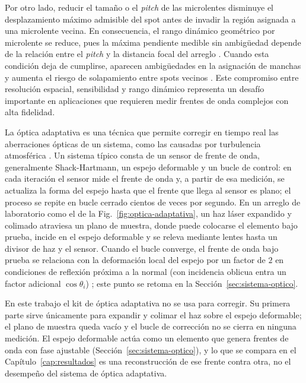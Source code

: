 \documentclass[letterpaper,12pt,oneside]{book}
\makeatletter
\renewcommand\section{\@startsection{section}{1}{\z@}{-3.5ex \@plus -1ex \@minus -.2ex}{2.3ex \@plus.2ex}{\normalfont\Large\bfseries\raggedright}}
\makeatother
\begin{document}
Por otro lado, reducir el tamaño o el \textit{pitch} de las microlentes disminuye el
desplazamiento máximo admisible del spot antes de invadir la región asignada a una
microlente vecina. En consecuencia, el rango dinámico geométrico por microlente se reduce,
pues la máxima pendiente medible sin ambigüedad depende de la relación entre el
\textit{pitch} y la distancia focal del arreglo \cite{AkondiDubra,FuerstDivergent}. Cuando
esta condición deja de cumplirse, aparecen ambigüedades en la asignación de manchas y
aumenta el riesgo de solapamiento entre spots vecinos \cite{GuoScanning,AkondiDubra}. Este
compromiso entre resolución espacial, sensibilidad y rango dinámico representa un desafío
importante en aplicaciones que requieren medir frentes de onda complejos con alta
fidelidad.

\section{Óptica adaptativa} \label{ch:optica-adaptativa}

La óptica adaptativa es una técnica que permite corregir en tiempo real las aberraciones
ópticas de un sistema, como las causadas por turbulencia atmosférica \cite{TysonAO}. Un
sistema típico consta de un sensor de frente de onda, generalmente Shack-Hartmann, un
espejo deformable y un bucle de control: en cada iteración el sensor mide el frente de
onda y, a partir de esa medición, se actualiza la forma del espejo hasta que el frente que
llega al sensor es plano; el proceso se repite en bucle cerrado cientos de veces por
segundo. En un arreglo de laboratorio como el de la Fig.~\ref{fig:optica-adaptativa}, un
haz láser expandido y colimado atraviesa un plano de muestra, donde puede colocarse el
elemento bajo prueba, incide en el espejo deformable y se releva mediante lentes hasta un
divisor de haz y el sensor. Cuando el bucle converge, el frente de onda bajo prueba se
relaciona con la deformación local del espejo por un factor de $2$ en condiciones de
reflexión próxima a la normal (con incidencia oblicua entra un factor adicional
$\cos\theta_i$) \cite[p.~31 y Anexo~1]{BribiescasTesis}; este punto se retoma en la
Sección~\ref{sec:sistema-optico}.

En este trabajo el kit de óptica adaptativa no se usa para corregir. Su primera parte
sirve únicamente para expandir y colimar el haz sobre el espejo deformable; el plano de
muestra queda vacío y el bucle de corrección no se cierra en ninguna medición. El espejo
deformable actúa como un elemento que genera frentes de onda con fase ajustable
(Sección~\ref{sec:sistema-optico}), y lo que se compara en el
Capítulo~\ref{cap:resultados} es una reconstrucción de ese frente contra otra, no el
desempeño del sistema de óptica adaptativa.
\end{document}
